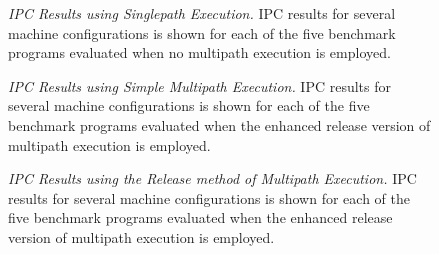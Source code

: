 %
\begin{figure}
\centering
{}
\caption{{\em IPC Results using Singlepath Execution.} 
IPC results for several machine configurations is shown for each of
the five benchmark programs evaluated when no multipath execution
is employed.}
\label{fig:ipc1}
\end{figure}
%
\begin{figure}
\centering
{}
\caption{{\em IPC Results using Simple Multipath Execution.} 
IPC results for several machine configurations is shown for each of
the five benchmark programs evaluated when the enhanced release version of
multipath execution is employed.}
\label{fig:ipc2}
\end{figure}
%
\begin{figure}
\centering
{}
\caption{{\em IPC Results using the Release method of Multipath Execution.} 
IPC results for several machine configurations is shown for each of
the five benchmark programs evaluated when the enhanced release version of
multipath execution is employed.}
\label{fig:ipc3}
\end{figure}
